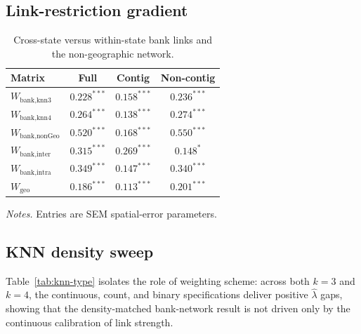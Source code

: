 \subsection{Link-restriction gradient}
\begin{table}[htbp]
  \centering
  \caption{Cross-state versus within-state bank links and the non-geographic network.}
  \label{tab:linkrestrict}
  \small
  \begin{tabular}{lccc}
    \toprule
    Matrix & Full & Contig & Non-contig \\
    \midrule
    $W_{\text{bank,knn3}}$ & $0.228^{***}$ & $0.158^{***}$ & $0.236^{***}$ \\
    $W_{\text{bank,knn4}}$ & $0.264^{***}$ & $0.138^{***}$ & $0.274^{***}$ \\
    $W_{\text{bank,nonGeo}}$ & $0.520^{***}$ & $0.168^{***}$ & $0.550^{***}$ \\
    $W_{\text{bank,inter}}$ & $0.315^{***}$ & $0.269^{***}$ & $0.148^{*}$ \\
    $W_{\text{bank,intra}}$ & $0.349^{***}$ & $0.147^{***}$ & $0.340^{***}$ \\
    $W_{\text{geo}}$ & $0.186^{***}$ & $0.113^{***}$ & $0.201^{***}$ \\
    \bottomrule
  \end{tabular}
  \begin{tablenotes}\footnotesize
  \item \emph{Notes.} Entries are SEM spatial-error parameters.
  \end{tablenotes}
\end{table}
 
\subsection{KNN density sweep}

Table~\ref{tab:knn-type} isolates the role of weighting scheme: across both
$k=3$ and $k=4$, the continuous, count, and binary specifications deliver
positive $\hat\lambda$ gaps, showing that the density-matched bank-network
result is not driven only by the continuous calibration of link strength.

